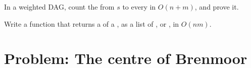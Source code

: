 \begin{exercise}[$\star\star\star$]\label{exo:b1:shortest-paths:11}
In a weighted DAG, count the  from $s$ to every  in $O(n + m)$, and prove it.
\end{exercise}

\begin{exercise}[$\star\star\star$]\label{exo:b1:shortest-paths:12}
Write a function that returns a  of a , as a list of , or , in $O(nm)$.
\end{exercise}

\section{Problem: The centre of Brenmoor}\label{sec:b1:shortest-paths:problem}


